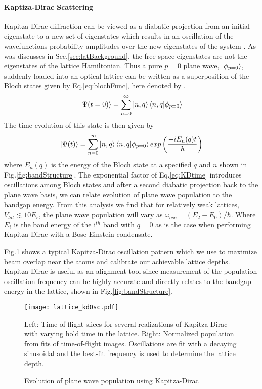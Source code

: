 \paragraph{Kaptiza-Dirac Scattering}
Kapitza-Dirac diffraction can be viewed as a diabatic projection from an initial eigenstate to a new set of eigenstates which results in an oscillation of the wavefunctions probability amplitudes over the new eigenstates of the system \cite{Denschlag2002}.
As was discusses in Sec.\;\ref{sec:latBackground}, the free space eigenstates are not the eigenstates of the lattice Hamiltonian. 
Thus a pure $p=0$ plane wave, $\left| {\phi_{p=0}} \right>$, suddenly loaded into an optical lattice can be written as a superposition of the Bloch states given by Eq.\;\ref{eq:blochFunc}, here denoted by .
	\begin{equation} \label{eq:p0inBloch}
		\left| {\Psi(t=0)} \right> = \sum_{n=0}^{\infty} \left| {n,q} \right> \left< {n,q} | {\phi_{p=0}} \right>
	\end{equation}
The time evolution of this state is then given by
	\begin{equation} \label{eq:KDtime}
		\left| {\Psi(t)} \right> = \sum_{n=0}^{\infty} \left| {n,q} \right> \left< {n,q} | {\phi_{p=0}} \right> exp \left( \frac{-i E_n(q) t}{\hbar} \right)
	\end{equation}
where $E_n(q)$ is the energy of the Bloch state at a specified $q$ and $n$ shown in Fig.\;\ref{fig:bandStructure}.
The exponential factor of Eq.\;\ref{eq:KDtime} introduces oscillations among Bloch states and after a second diabatic projection back to the plane wave basis, we can relate evolution of plane wave population to the bandgap energy.
From this analysis we find that for relatively weak lattices, $V_{lat} \lesssim 10 E_r$, the plane wave population will vary as $\omega_{osc} = (E_2 - E_0) / \hbar$.
Where $E_i$ is the band energy of the i$^{th}$ band with $q=0$ as is the case when performing Kapitza-Dirac with a Bose-Einstein condensate.

Fig.\;\ref{fig:KDoscillations} shows a typical Kapitza-Dirac oscillation pattern which we use to maximize beam overlap near the atoms and calibrate our achievable lattice depths. 
Kapitza-Dirac is useful as an alignment tool since measurement of the population oscillation frequency can be highly accurate and directly relates to the bandgap energy in the lattice, shown in Fig.\;\ref{fig:bandStructure}. 
	\begin{figure}
		\texttt{[image: lattice\_kdOsc.pdf]}
		\caption{Evolution of plane wave population using Kapitza-Dirac}{Left: Time of flight slices for several realizations of Kapitza-Dirac with varying hold time in the lattice. Right: Normalized population from fits of time-of-flight images. Oscillations are fit with a decaying sinusoidal and the best-fit frequency is used to determine the lattice depth.}
		 \label{fig:KDoscillations}
	\end{figure}
	
